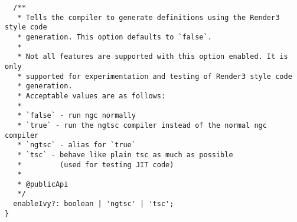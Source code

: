 \begin{verbatim}
  /**
   * Tells the compiler to generate definitions using the Render3 style code
   * generation. This option defaults to `false`.
   *
   * Not all features are supported with this option enabled. It is only
   * supported for experimentation and testing of Render3 style code
   * generation.
   * Acceptable values are as follows:
   *
   * `false` - run ngc normally
   * `true` - run the ngtsc compiler instead of the normal ngc compiler
   * `ngtsc` - alias for `true`
   * `tsc` - behave like plain tsc as much as possible
   *         (used for testing JIT code)
   *
   * @publicApi
   */
  enableIvy?: boolean | 'ngtsc' | 'tsc';
}
\end{verbatim}
